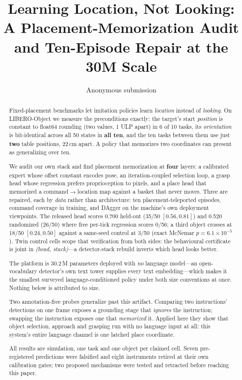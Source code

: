 \documentclass[10pt,twocolumn,letterpaper]{article}
\title{\bfseries Learning Location, Not Looking:\\
A Placement-Memorization Audit and Ten-Episode Repair at the 30M Scale}
\author{Anonymous submission}
\date{}
\begin{document}
\maketitle

\begin{abstract}
Fixed-placement benchmarks let imitation policies learn \emph{location} instead
of \emph{looking}. On LIBERO-Object we measure the preconditions exactly: the
target's start \emph{position} is constant to float64 rounding (two values,
1 ULP apart) in 6 of 10 tasks, its \emph{orientation} is bit-identical across
all 50 states in \textbf{all ten}, and the ten tasks between them use just
\textbf{two} table positions, 22\,cm apart. A policy that memorizes two coordinates can present as
generalizing over ten.

We audit our own stack and find placement memorization at \textbf{four} layers:
a calibrated expert whose offset constant encodes pose, an iteration-coupled
selection loop, a grasp head whose regression prefers proprioception to pixels,
and a place head that memorized a command$\to$location map against a basket that
never moves. Three are repaired, each by \emph{data} rather than architecture:
ten placement-teleported episodes, command coverage in training, and DAgger on
the machine's own deployment viewpoints. The released head scores 0.700
held-out (35/50 $[0.56,0.81]$) and 0.520 randomized (26/50) where free per-tick
regression scores 0/56; a third object crosses at 18/50 $[0.24,0.50]$ against a
same-seed control at 3/50 (exact McNemar $p{=}6.1\times10^{-5}$). Twin control
cells scope that verification from both sides: the behavioural certificate is
joint in \emph{(head, stack)}---a detector-stack rebuild inverts which head
looks better.

The platform is 30.2\,M parameters deployed with \emph{no} language model---an
open-vocabulary detector's own text tower supplies every text embedding---which
makes it the smallest surveyed language-conditioned policy under both size
conventions at once. Nothing below is attributed to size.

Two annotation-free probes generalize past this artifact. Comparing two
instructions' detections on one frame exposes a grounding stage that
\emph{ignores} the instruction; swapping the instruction exposes one that
\emph{memorized} it. Applied here they show that object selection, approach and
grasping run with no language input at all: this system's entire language
channel is one latched place coordinate.

All results are simulation, one task and one object per claimed cell. Seven
pre-registered predictions were falsified and eight instruments retired at
their own calibration gates; two proposed mechanisms were tested and retracted
before reaching this paper.
\end{abstract}
\end{document}
